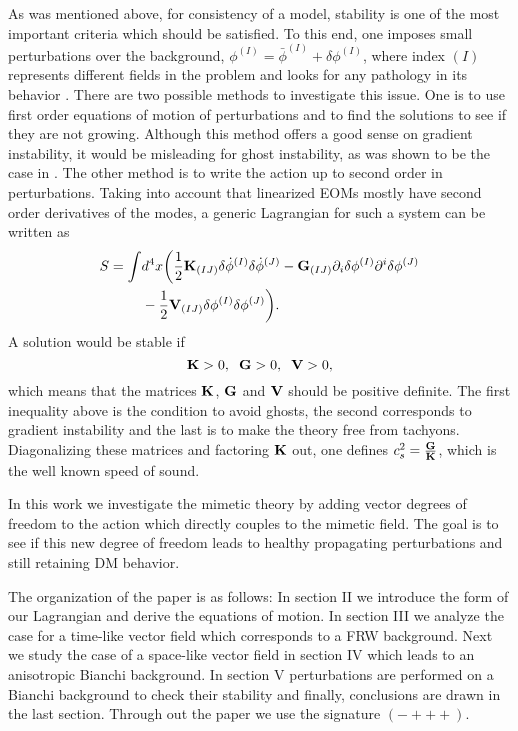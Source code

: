 \documentclass[%
 reprint,
 amsmath,amssymb,
 aps,
]{revtex4-1}
\begin{document}
As was mentioned above, for consistency of a model,  stability is  one of the most important criteria which should be satisfied. To this end, one imposes  small perturbations over the background, $\phi^{(I)}=\bar{\phi}^{(I)}+\delta\phi^{(I)}$, where index $(I)$ represents different fields in the problem and looks for any pathology in its behavior  \cite{Rubakov:2014jja}. There are two possible methods to investigate this issue. One is to use first order equations of motion of perturbations and to find the solutions to see if they  are not growing. Although this method offers a good sense on gradient instability, it would be misleading for ghost instability, as was shown to be the case in \cite{Chamseddine:2014vna}. The other  method is to write the action up to second order in perturbations. Taking into account that linearized EOMs mostly have second order derivatives of the modes, a generic Lagrangian for such a system can be written as
\begin{equation}
\begin{split}
S=\int &d^4x\biggl(\frac{1}{2}\bold{K}_{(IJ)}\delta\dot{\phi}^{(I)}\delta\dot{\phi}^{(J)} -\bold{G}_{(IJ)}\partial_i\delta\phi^{(I)}\partial^i\delta\phi^{(J)}\\
&-\frac{1}{2}\bold{V}_{(IJ)}\delta\phi^{(I)}\delta\phi^{(J)}\biggr).
\end{split}
\end{equation}
A solution would be stable if
\begin{equation}\label{stab}
\bold{K}>0, \hspace{2mm}\bold{G}>0,\hspace{2mm} \bold{V}>0,
\end{equation}
which means that the matrices $\bold{K}$, $\bold{G}$ and $\bold{V}$ should be positive definite. The first inequality above is the condition to avoid ghosts, the second corresponds to gradient instability and the last is to make the theory free from tachyons. Diagonalizing these matrices and factoring  $\bold{K}$ out, one defines $c_s^2=\frac{\bold{G}}{\bold{K}}$, which is the well known speed of sound.

In this work we investigate the mimetic theory by adding vector degrees of freedom to the action which directly couples to the mimetic field. The goal is to see if this new degree of freedom leads to healthy propagating perturbations and still retaining DM behavior.

The organization of the paper is as follows: In section II we introduce the form of our Lagrangian and derive the equations of motion. In section III we analyze the case for a time-like vector field which corresponds to a FRW background. Next  we study the case of a space-like vector field in section IV which leads to an anisotropic Bianchi background. In section V perturbations are performed on a Bianchi background to check their stability and finally, conclusions are drawn in the last section. Through out the paper we use the signature $(-+++)$.
\end{document}
